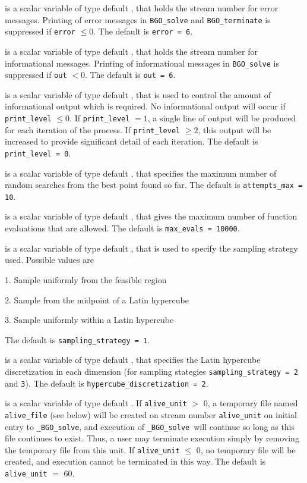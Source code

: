 \documentclass{galahad}
\newcommand{\packagename}{BGO}
\newcommand{\fullpackagename}{\libraryname\_\packagename}
\newcommand{\solver}{{\tt \fullpackagename\_solve}}
\begin{document}
\begin{description}

 is a scalar variable of type default \integer, that holds the
stream number for error messages. Printing of error messages in
{\tt \packagename\_solve} and {\tt \packagename\_terminate}
is suppressed if {\tt error} $\leq 0$.
The default is {\tt error = 6}.

 is a scalar variable of type default \integer, that holds the
stream number for informational messages. Printing of informational messages in
{\tt \packagename\_solve} is suppressed if {\tt out} $< 0$.
The default is {\tt out = 6}.

 is a scalar variable of type default \integer, that is used
to control the amount of informational output which is required. No
informational output will occur if {\tt print\_level} $\leq 0$. If
{\tt print\_level} $= 1$, a single line of output will be produced for each
iteration of the process. If {\tt print\_level} $\geq 2$, this output will be
increased to provide significant detail of each iteration.
The default is {\tt print\_level = 0}.

 is a scalar variable of type default \integer, that 
specifies the maximum number of random searches from the best point 
found so far.
The default is {\tt attempts\_max = 10}.

 is a scalar variable of type default \integer, that gives
the maximum number of function evaluations that are allowed.
The default is {\tt max\_evals = 10000}.

 is a scalar variable of type default \integer, 
that is used to specify the sampling strategy used. Possible values are
\begin{description}
\item 1. Sample uniformly from the feasible region
\item 2. Sample from the midpoint of a Latin hypercube
\item 3. Sample uniformly within a Latin hypercube
\end{description}
The default is {\tt sampling\_strategy = 1}.

 is a scalar variable of type default \integer, 
that specifies the Latin hypercube discretization in each dimension
(for sampling stategies {\tt sampling\_strategy = 2} and {\tt 3}).
The default is {\tt hyper\-cube\_discretization = 2}.

 is a scalar variable of type default \integer.
If {\tt alive\_unit} $>$ 0, a temporary file named {\tt alive\_file} (see below)
will be created on stream number {\tt alive\_unit} on initial entry to
\solver, and execution of \solver\ will continue so
long as this file continues to exist. Thus, a user may terminate execution
simply by removing the temporary file from this unit.
If {\tt alive\_unit} $\leq$ 0, no temporary file will be created, and
execution cannot be terminated in this way.
The default is {\tt alive\_unit} $=$ 60.


\end{description}
\end{document}
